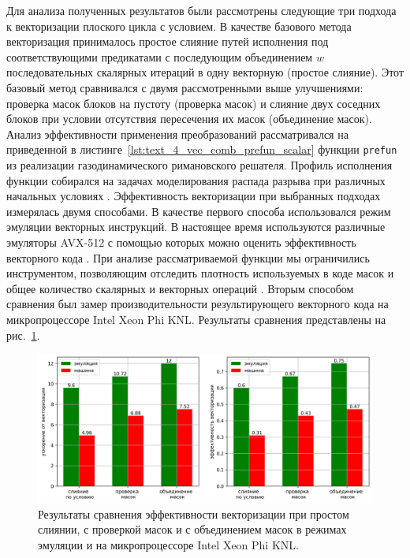 Для анализа полученных результатов были рассмотрены следующие три подхода к векторизации плоского цикла с условием.
В качестве базового метода векторизация принималось простое слияние путей исполнения под соответствующими предикатами с последующим объединением $w$ последовательных скалярных итераций в одну векторную (простое слияние).
Этот базовый метод сравнивался с двумя рассмотренными выше улучшениями: проверка масок блоков на пустоту (проверка масок) и слияние двух соседних блоков при условии отсутствия пересечения их масок (объединение масок).
Анализ эффективности применения преобразований рассматривался на приведенной в листинге~\ref{lst:text_4_vec_comb_prefun_scalar} функции \texttt{prefun} из реализации газодинамического римановского решателя.
Профиль исполнения функции собирался на задачах моделирования распада разрыва при различных начальных условиях \cite{Toh2024VecRiemann,Zeng2021VecRiemann}.
Эффективность векторизации при выбранных подходах измерялась двумя способами.
В качестве первого способа использовался режим эмуляции векторных инструкций.
В настоящее время используются различные эмуляторы AVX-512 с помощью которых можно оценить эффективность векторного кода \cite{Lee2024VecGem}.
При анализе рассматриваемой функции мы ограничились инструментом, позволяющим отследить плотность используемых в коде масок и общее количество скалярных и векторных операций \cite{Rybakov2023VecShvindt}.
Вторым способом сравнения был замер производительности результирующего векторного кода на микропроцессоре Intel Xeon Phi KNL.
Результаты сравнения представлены на рис.~\ref{fig:text_4_vec_comb_mask_res}.

\begin{figure}[ht]
\centering
\includegraphics[width=1.0\textwidth]{./fig/vec_masks_union_res.png}
\singlespacing
{}\caption{Результаты сравнения эффективности векторизации при простом слиянии, с проверкой масок и с объединением масок в режимах эмуляции и на микропроцессоре Intel Xeon Phi KNL.}
\label{fig:text_4_vec_comb_mask_res}
\end{figure}

